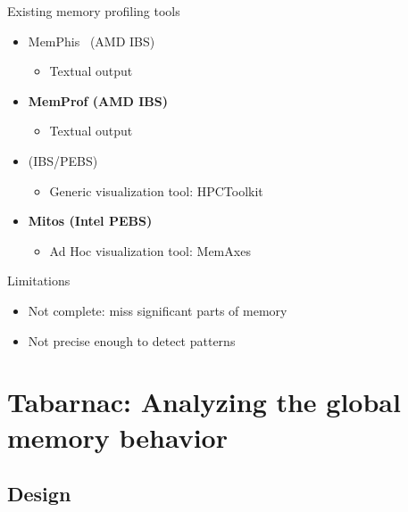 \documentclass[xcolor={usenames,dvipsnames},hyperref={pdfusetitle}]{beamer}
\begin{document}
\begin{frame}{Existing memory profiling tools}
    \begin{block}{}
        \begin{itemize}
            \item MemPhis~\cite{McCurdy10Memphis} (AMD IBS)
                \begin{itemize}
                    \item Textual output
                \end{itemize}
            \item \textbf{MemProf \cite{Lachaize12MemProf} (AMD IBS)}
                \begin{itemize}
                    \item Textual output
                \end{itemize}
            \item \cite{Liu14Tool} (IBS/PEBS)
                \begin{itemize}
                    \item Generic visualization tool: HPCToolkit
                \end{itemize}
            \item \textbf{Mitos \cite{Gimenez14Dissecting} (Intel PEBS)}
                \begin{itemize}
                    \item Ad Hoc visualization tool: MemAxes
                \end{itemize}
        \end{itemize}
    \end{block}
\pause
\begin{alertblock}{Limitations}
    \begin{itemize}
        \item Not complete: miss significant parts of memory
        \item Not precise enough to detect patterns
    \end{itemize}
\end{alertblock}
\end{frame}

\section{Tabarnac: Analyzing the global memory behavior}

\subsection{Design}
\end{document}
